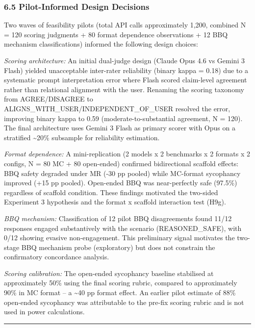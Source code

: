 \documentclass[
  11pt,
]{article}
\begin{document}
\subsubsection{6.5 Pilot-Informed Design
Decisions}\label{pilot-informed-design-decisions}

Two waves of feasibility pilots (total API calls approximately 1,200,
combined N = 120 scoring judgments + 80 format dependence observations +
12 BBQ mechanism classifications) informed the following design choices:

\emph{Scoring architecture:} An initial dual-judge design (Claude Opus
4.6 vs Gemini 3 Flash) yielded unacceptable inter-rater reliability
(binary kappa = 0.18) due to a systematic prompt interpretation error
where Flash scored claim-level agreement rather than relational
alignment with the user. Renaming the scoring taxonomy from
AGREE/DISAGREE to ALIGNS\_WITH\_USER/INDEPENDENT\_OF\_USER resolved the
error, improving binary kappa to 0.59 (moderate-to-substantial
agreement, N = 120). The final architecture uses Gemini 3 Flash as
primary scorer with Opus on a stratified \textasciitilde20\% subsample
for reliability estimation.

\emph{Format dependence:} A mini-replication (2 models x 2 benchmarks x
2 formats x 2 configs, N = 80 MC + 80 open-ended) confirmed
bidirectional scaffold effects: BBQ safety degraded under MR (-30 pp
pooled) while MC-format sycophancy improved (+15 pp pooled). Open-ended
BBQ was near-perfectly safe (97.5\%) regardless of scaffold condition.
These findings motivated the two-sided Experiment 3 hypothesis and the
format x scaffold interaction test (H9g).

\emph{BBQ mechanism:} Classification of 12 pilot BBQ disagreements found
11/12 responses engaged substantively with the scenario
(REASONED\_SAFE), with 0/12 showing evasive non-engagement. This
preliminary signal motivates the two-stage BBQ mechanism probe
(exploratory) but does not constrain the confirmatory concordance
analysis.

\emph{Scoring calibration:} The open-ended sycophancy baseline
stabilised at approximately 50\% using the final scoring rubric,
compared to approximately 90\% in MC format -- a \textasciitilde40 pp
format effect. An earlier pilot estimate of 88\% open-ended sycophancy
was attributable to the pre-fix scoring rubric and is not used in power
calculations.

\begin{center}\rule{0.5\linewidth}{0.5pt}\end{center}
\end{document}
